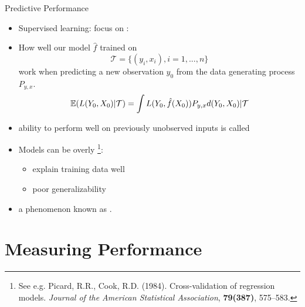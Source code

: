 \documentclass[10pt]{beamer}
\begin{document}
\begin{frame}{Predictive Performance}


\begin{itemize}
\item Supervised learning: focus on :
\item How well our model $\hat{f}$ trained on
\[
\mathcal{T}=\{(y_i, x_i), i = 1, ..., n\}
\]
work when predicting a new observation $y_0$ from the data generating process $P_{y,x}$.
\[
\operatorname{\mathbb{E}}(L(Y_0,X_0)|\mathcal{T}) = \int L(Y_0, \hat{f}(X_0)) P_{y,x} d(Y_0,X_0) |\mathcal{T}
\]
\item ability to perform well on previously unobserved inputs is called 



\item Models can be overly \footnote{See e.g. Picard, R.R., Cook, R.D. (1984). Cross-validation of regression models. \emph{Journal of the American Statistical Association}, \textbf{79(387)}, 575--583.}:
\begin{itemize}
\item explain training data well
\item poor generalizability
\end{itemize}
\item a phenomenon known as .
\end{itemize}

\end{frame}

\section{Measuring Performance}
\frame{\sectionpage}
\end{document}

